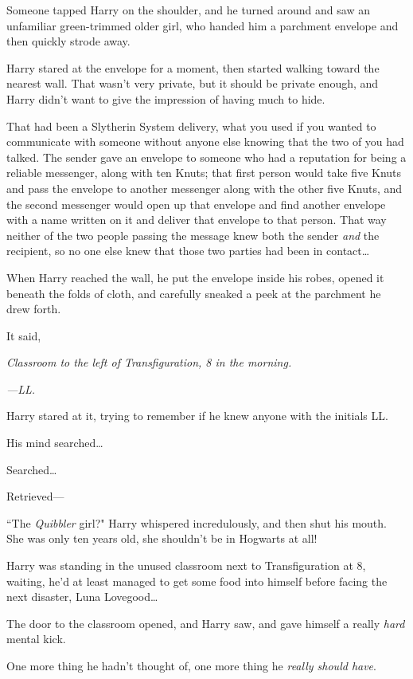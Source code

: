 Someone tapped Harry on the shoulder, and he turned around and saw an unfamiliar green-trimmed older girl, who handed him a parchment envelope and then quickly strode away.

Harry stared at the envelope for a moment, then started walking toward the nearest wall. That wasn't very private, but it should be private enough, and Harry didn't want to give the impression of having much to hide.

That had been a Slytherin System delivery, what you used if you wanted to communicate with someone without anyone else knowing that the two of you had talked. The sender gave an envelope to someone who had a reputation for being a reliable messenger, along with ten Knuts; that first person would take five Knuts and pass the envelope to another messenger along with the other five Knuts, and the second messenger would open up that envelope and find another envelope with a name written on it and deliver that envelope to that person. That way neither of the two people passing the message knew both the sender \emph{and} the recipient, so no one else knew that those two parties had been in contact{\ldots}

When Harry reached the wall, he put the envelope inside his robes, opened it beneath the folds of cloth, and carefully sneaked a peek at the parchment he drew forth.

It said,

\emph{Classroom to the left of Transfiguration, 8 in the morning.}

\emph{---LL.}

Harry stared at it, trying to remember if he knew anyone with the initials LL.

His mind searched{\ldots}

Searched{\ldots}

Retrieved---

``The \emph{Quibbler} girl?" Harry whispered incredulously, and then shut his mouth. She was only ten years old, she shouldn't be in Hogwarts at all!


Harry was standing in the unused classroom next to Transfiguration at 8\am, waiting, he'd at least managed to get some food into himself before facing the next disaster, Luna Lovegood{\ldots}

The door to the classroom opened, and Harry saw, and gave himself a really \emph{hard} mental kick.

One more thing he hadn't thought of, one more thing he \emph{really should have}.

